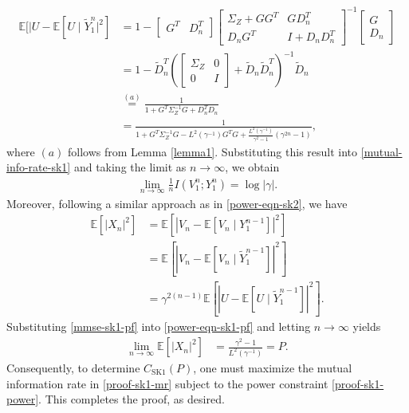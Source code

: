 \documentclass[12pt]{article}
\newcommand{\E}{\mathbb{E}}
\begin{document}
\begin{equation}\label{mmse-sk1-pf}
   \begin{aligned}
      \E[|U-\E[U\mid\widetilde{Y}_1^n|^2] &= 1 - \begin{bmatrix}G^T &D_n^T \end{bmatrix}\begin{bmatrix}\Sigma_{Z}+GG^T&GD_n^T\\[2pt]D_nG^T&I+D_nD_n^T \end{bmatrix}^{-1}\begin{bmatrix}G \\[2pt]D_n\end{bmatrix}\\
      &=1 - \widetilde{D}_n^T\left(\begin{bmatrix}\Sigma_Z &0\\[2pt]0 &I\end{bmatrix}+\widetilde{D}_n\widetilde{D}_n^T\right)^{-1}\widetilde{D}_n \\
      &\overset{(a)}{=}  \frac{1}{1+G^T\Sigma_Z^{-1}G+D_n^TD_n}\\
      &= \frac{1}{1+G^T\Sigma_Z^{-1}G - L^2(\gamma^{-1})G^TG +\frac{L^{2}(\gamma^{-1})}{\gamma^{2}-1}(\gamma^{2n}-1)},
   \end{aligned}
\end{equation}
where $(a)$ follows from Lemma \ref{lemma1}.  Substituting this result into \eqref{mutual-info-rate-sk1} and taking the limit as $n\to\infty$, we obtain
\begin{equation}\label{proof-sk1-mr}
\begin{aligned}
\lim_{n\to\infty}\frac{1}{n}I(V_1^n;Y_1^n) = \log|\gamma|.
\end{aligned}
\end{equation}
Moreover, following a similar approach as in \eqref{power-eqn-sk2}, we have
\begin{equation}\label{power-eqn-sk1-pf}
   \begin{aligned}
   \E[|X_n|^2] &=\E[|V_n - \E[V_n\mid Y_1^{n-1}]|^2]\\
            &= \E[|V_n - \E[V_n\mid \widetilde{Y}_1^{n-1}]|^2]\\
            &=\gamma^{2(n-1)}\E[|U- \E[U\mid\widetilde{Y}_{1}^{n-1}]|^2].
   \end{aligned}
\end{equation}
Substituting \eqref{mmse-sk1-pf} into \eqref{power-eqn-sk1-pf} and letting $n\to\infty$  yields
\begin{equation}\label{proof-sk1-power}
   \begin{aligned}
   \lim_{n\to\infty}\E[|X_n|^2] &= \frac{\gamma^2-1}{L^2(\gamma^{-1})}= P.
 \end{aligned}
\end{equation}
Consequently, to determine $C_\mathrm{SK1}(P)$, one must maximize the mutual information rate in \eqref{proof-sk1-mr} subject to the power constraint \eqref{proof-sk1-power}. This completes the proof, as desired.
\end{document}
